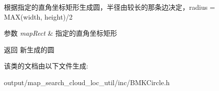 根据指定的直角坐标矩形生成圆，半径由较长的那条边决定，radius = M\+A\+X(width, height)/2 
\begin{DoxyParams}{参数}
{\em map\+Rect} & 指定的直角坐标矩形 \\
\hline
\end{DoxyParams}
\begin{DoxyReturn}{返回}
新生成的圆 
\end{DoxyReturn}


该类的文档由以下文件生成\+:\begin{DoxyCompactItemize}
\item 
output/map\+\_\+search\+\_\+cloud\+\_\+loc\+\_\+util/inc/B\+M\+K\+Circle.\+h\end{DoxyCompactItemize}

